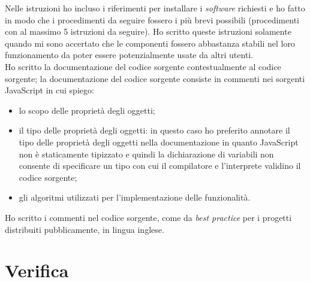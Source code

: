 Nelle istruzioni ho incluso i riferimenti per installare i \emph{software} richiesti e ho fatto in modo che i procedimenti da seguire fossero i più brevi possibili (procedimenti con al massimo 5 istruzioni da seguire). Ho scritto queste istruzioni solamente quando mi sono accertato che le componenti fossero abbastanza stabili nel loro funzionamento da poter essere potenzialmente usate da altri utenti.\\
Ho scritto la documentazione del codice sorgente contestualmente al codice sorgente; la documentazione del codice sorgente consiste in commenti nei sorgenti JavaScript in cui spiego:
\begin{itemize}
	\item lo scopo delle proprietà degli oggetti;
	\item il tipo delle proprietà degli oggetti: in questo caso ho preferito annotare il tipo delle proprietà degli oggetti nella documentazione in quanto JavaScript non è staticamente tipizzato e quindi la dichiarazione di variabili non consente di specificare un tipo con cui il compilatore e l'interprete validino il codice sorgente;
	\item gli algoritmi utilizzati per l'implementazione delle funzionalità.
\end{itemize}
Ho scritto i commenti nel codice sorgente, come da \emph{best practice} per i progetti distribuiti pubblicamente, in lingua inglese.

\newpage

\section{Verifica}

